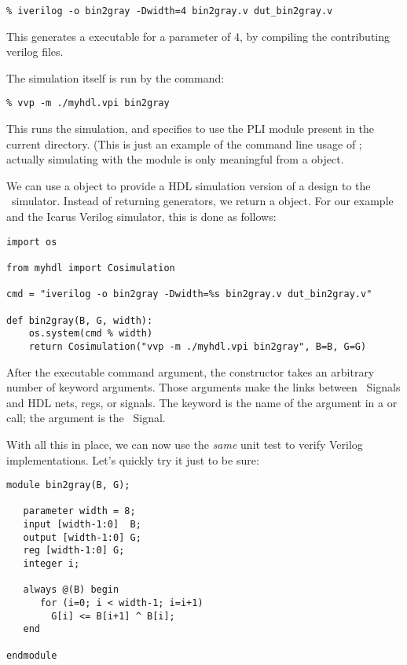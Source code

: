 \begin{verbatim}
% iverilog -o bin2gray -Dwidth=4 bin2gray.v dut_bin2gray.v

\end{verbatim}

This generates a  executable for a parameter 
of 4, by compiling the contributing verilog files.

The simulation itself is run by the  command:

\begin{verbatim}
% vvp -m ./myhdl.vpi bin2gray

\end{verbatim}

This runs the  simulation, and specifies to use the
 PLI module present in the current directory. (This is 
just an example of the command line usage of ; actually
simulating with the  module is only meaningful from a
 object.

We can use a  object to provide a HDL simulation
version of a design to the \myhdl\ simulator. Instead of returning
generators, we return a  object. For our example
and the Icarus Verilog simulator, this is done as follows:

\begin{verbatim}
import os

from myhdl import Cosimulation

cmd = "iverilog -o bin2gray -Dwidth=%s bin2gray.v dut_bin2gray.v"
      
def bin2gray(B, G, width):
    os.system(cmd % width)
    return Cosimulation("vvp -m ./myhdl.vpi bin2gray", B=B, G=G)

\end{verbatim}

After the executable command argument, the 
constructor takes an arbitrary number of keyword arguments. Those
arguments make the links between \myhdl\ Signals and HDL nets, regs,
or signals. The keyword is the name of the argument in a 
 or  call; the argument is the
\myhdl\ Signal.

With all this in place, we can now use the \emph{same} unit test
to verify Verilog implementations. Let's quickly try it just to be
sure:

\begin{verbatim}
module bin2gray(B, G);

   parameter width = 8;
   input [width-1:0]  B;
   output [width-1:0] G;
   reg [width-1:0] G;
   integer i;

   always @(B) begin
      for (i=0; i < width-1; i=i+1)
        G[i] <= B[i+1] ^ B[i];
   end

endmodule

\end{verbatim}

